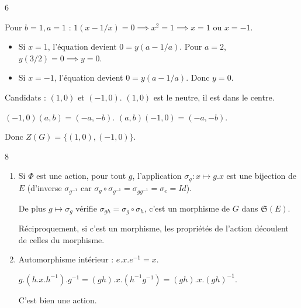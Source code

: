 \begin{correction}{6}
\begin{enumerate}
\begin{enumerate}
        Pour $b=1, a=1$ : $1(x-1/x) = 0 \implies x^2=1 \implies x=1$ ou $x=-1$.
        \begin{itemize}
            \item Si $x=1$, l'équation devient $0 = y(a-1/a)$. Pour $a=2$, $y(3/2)=0 \implies y=0$.
            \item Si $x=-1$, l'équation devient $0 = y(a-1/a)$. Donc $y=0$.
        \end{itemize}
        Candidats : $(1,0)$ et $(-1,0)$.
        $(1,0)$ est le neutre, il est dans le centre.

        $(-1,0)(a,b) = (-a, -b)$. $(a,b)(-1,0) = (-a, -b)$.

        Donc $Z(G) = \{ (1,0), (-1,0) \}$.
    \end{enumerate}
\end{enumerate}
\end{correction}

\begin{correction}{8}
\begin{enumerate}
    \item Si $\Phi$ est une action, pour tout $g$, l'application $\sigma_g : x \mapsto g.x$ 
        est une bijection de $E$ (d'inverse $\sigma_{g^{-1}}$ car $\sigma_g \circ \sigma_{g^{-1}} = \sigma_{gg^{-1}} = \sigma_e = Id$).

        De plus $g \mapsto \sigma_g$ vérifie $\sigma_{gh} = \sigma_g \circ \sigma_h$, c'est un morphisme de $G$ dans $\mathfrak{S}(E)$.
        
        Réciproquement, si c'est un morphisme, les propriétés de l'action découlent de celles du morphisme.

    \item Automorphisme intérieur :
        $e.x.e^{-1} = x$.

        $g.(h.x.h^{-1}).g^{-1} = (gh).x.(h^{-1}g^{-1}) = (gh).x.(gh)^{-1}$.

        C'est bien une action.
\end{enumerate}
\end{correction}

